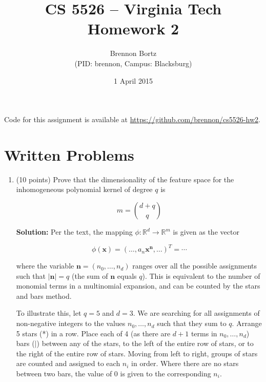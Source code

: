\documentclass[11pt]{article}
\begin{document}
\title{CS 5526 -- Virginia Tech\\
	Homework 2}
\author{Brennon Bortz \\ (PID: brennon, Campus: Blacksburg)}
\date{1 April 2015}
\maketitle

Code for this assignment is available at \url{https://github.com/brennon/cs5526-hw2}.

\section*{Written Problems}

\begin{enumerate}

\item (10 points) Prove that the dimensionality of the feature space for the inhomogeneous polynomial kernel of degree $q$ is

\begin{equation}
m = \binom{d+q}{q} \nonumber
\end{equation}

\textbf{Solution:} Per the text, the mapping $\phi : \mathbb{R}^d \rightarrow \mathbb{R}^m$ is given as the vector

\begin{equation}
\phi(\mathbf{x}) = (\ldots , a_n \mathbf{x}^\mathbf{n} , \ldots)^\mathit{T} = \cdots \nonumber
\end{equation}

where the variable $\mathbf{n}=(n_0,\ldots,n_d)$ ranges over all the possible assignments such that $|\mathbf{n}|=q$ (the sum of $\mathbf{n}$ equals $q$). This is equivalent to the number of monomial terms in a multinomial expansion, and can be counted by the stars and bars method.

To illustrate this, let $q = 5$ and $d = 3$. We are searching for all assignments of non-negative integers to the values $n_0,\ldots,n_d$ such that they sum to $q$. Arrange 5 stars (*) in a row. Place each of 4 (as there are $d + 1$ terms in $n_0,\ldots,n_d$) bars ($|$) between any of the stars, to the left of the entire row of stars, or to the right of the entire row of stars. Moving from left to right, groups of stars are counted and assigned to each $n_i$ in order. Where there are no stars between two bars, the value of 0 is given to the corresponding $n_i$.


\end{enumerate}
\end{document}
